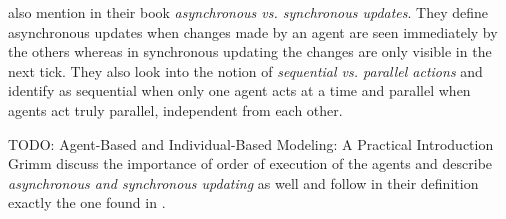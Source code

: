 \cite{wilensky_introduction_2015} also mention in their book \textit{asynchronous vs. synchronous updates}. They define asynchronous updates when changes made by an agent are seen immediately by the others whereas in synchronous updating the changes are only visible in the next tick. They also look into the notion of \textit{sequential vs. parallel actions} and identify as sequential when only one agent acts at a time and parallel when agents act truly parallel, independent from each other.

TODO: Agent-Based and Individual-Based Modeling: A Practical Introduction Grimm
discuss the importance of order of execution of the agents and describe \textit{asynchronous and synchronous updating} as well and follow in their definition exactly the one found in \cite{wilensky_introduction_2015}.